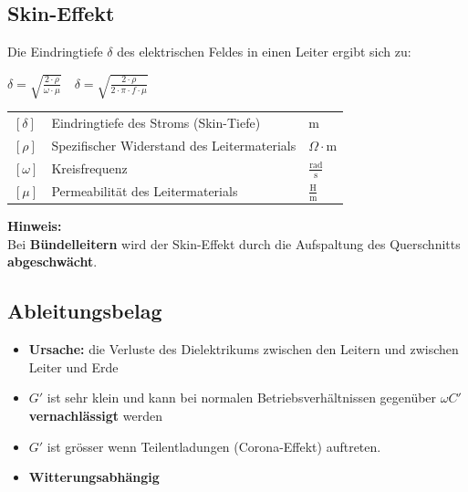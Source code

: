 \subsection{Skin-Effekt}

Die Eindringtiefe $\delta$ des elektrischen Feldes in einen Leiter ergibt sich zu:

\vspace{0.15cm}

$
\boxed{
\delta = \sqrt{\frac{2 \cdot \rho}{\omega \cdot \mu}}
}
\quad
\boxed{
\delta = \sqrt{\frac{2 \cdot \rho}{2 \cdot \pi \cdot f \cdot \mu}}
}
$

\vspace{0.15cm}

\renewcommand{\arraystretch}{1.2}
\begin{tabular}{@{} l p{6cm} l @{}}
    $[\delta]$   & Eindringtiefe des Stroms (Skin-Tiefe) \dotfill & $\text{m}$ \\
    $[\rho]$     & Spezifischer Widerstand des Leitermaterials \dotfill & $\Omega \cdot \text{m}$ \\
    $[\omega]$   & Kreisfrequenz \dotfill & $\frac{\text{rad}}{\text{s}}$ \\
    $[\mu]$      & Permeabilität des Leitermaterials \dotfill & $\frac{\text{H}}{\text{m}}$ \\
\end{tabular}

\vspace{0.5em}

\textbf{Hinweis:}\\
Bei \textbf{Bündelleitern} wird der Skin-Effekt durch die Aufspaltung des Querschnitts \textbf{abgeschwächt}.



\subsection{Ableitungsbelag}

\begin{itemize}
    \item \textbf{Ursache:} die Verluste des Dielektrikums zwischen den Leitern und zwischen Leiter und Erde
    \item $G'$ ist sehr klein und kann bei normalen Betriebsverhältnissen gegenüber $\omega C'$ \textbf{vernachlässigt} werden
    \item $G'$ ist grösser wenn Teilentladungen (Corona-Effekt) auftreten.
    \item \textbf{Witterungsabhängig}
  \end{itemize}


